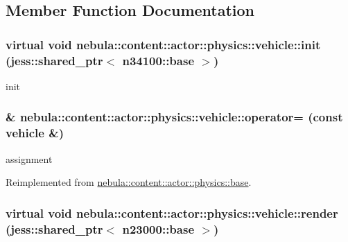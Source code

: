 \subsection{Member Function Documentation}
\hypertarget{classnebula_1_1content_1_1actor_1_1physics_1_1vehicle_a68d3d64aaf5adac6a25d2f2b935b7ecb}{
\subsubsection[{init}]{\setlength{\rightskip}{0pt plus 5cm}virtual void nebula::content::actor::physics::vehicle::init (jess::shared\_\-ptr$<$ {\bf n34100::base} $>$)}}
\label{classnebula_1_1content_1_1actor_1_1physics_1_1vehicle_a68d3d64aaf5adac6a25d2f2b935b7ecb}


init \hypertarget{classnebula_1_1content_1_1actor_1_1physics_1_1vehicle_a3f3cc0f6995d59a681f8a70a2969f148}{
\subsubsection[{operator=}]{\& nebula::content::actor::physics::vehicle::operator= (const {\bf vehicle} \&)}}
\label{classnebula_1_1content_1_1actor_1_1physics_1_1vehicle_a3f3cc0f6995d59a681f8a70a2969f148}


assignment 

Reimplemented from \hyperlink{classnebula_1_1content_1_1actor_1_1physics_1_1base_a8b950d8d7230bd6899cb3da7b6116f02}{nebula::content::actor::physics::base}.\hypertarget{classnebula_1_1content_1_1actor_1_1physics_1_1vehicle_a33dbcb9f951b8cec44dce3f7f83df97c}{
\subsubsection[{render}]{\setlength{\rightskip}{0pt plus 5cm}virtual void nebula::content::actor::physics::vehicle::render (jess::shared\_\-ptr$<$ {\bf n23000::base} $>$)}}
\label{classnebula_1_1content_1_1actor_1_1physics_1_1vehicle_a33dbcb9f951b8cec44dce3f7f83df97c}


